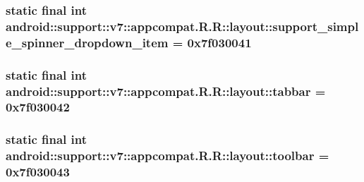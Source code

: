\hypertarget{classandroid_1_1support_1_1v7_1_1appcompat_1_1_r_1_1layout_258d42a22f6f38ba215d104c165310de}{
\subsubsection[{support\_\-simple\_\-spinner\_\-dropdown\_\-item}]{\setlength{\rightskip}{0pt plus 5cm}static final int android::support::v7::appcompat.R.R::layout::support\_\-simple\_\-spinner\_\-dropdown\_\-item = 0x7f030041}}
\label{classandroid_1_1support_1_1v7_1_1appcompat_1_1_r_1_1layout_258d42a22f6f38ba215d104c165310de}


\hypertarget{classandroid_1_1support_1_1v7_1_1appcompat_1_1_r_1_1layout_219cef8a8ee71ffaecf5826d004f4178}{
\subsubsection[{tabbar}]{\setlength{\rightskip}{0pt plus 5cm}static final int android::support::v7::appcompat.R.R::layout::tabbar = 0x7f030042}}
\label{classandroid_1_1support_1_1v7_1_1appcompat_1_1_r_1_1layout_219cef8a8ee71ffaecf5826d004f4178}


\hypertarget{classandroid_1_1support_1_1v7_1_1appcompat_1_1_r_1_1layout_9c0bb3532e39b200fe5a0e6b267acfbe}{
\subsubsection[{toolbar}]{\setlength{\rightskip}{0pt plus 5cm}static final int android::support::v7::appcompat.R.R::layout::toolbar = 0x7f030043}}
\label{classandroid_1_1support_1_1v7_1_1appcompat_1_1_r_1_1layout_9c0bb3532e39b200fe5a0e6b267acfbe}




